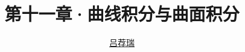 \documentclass[14pt,notheorems,leqno,xcolor={rgb}]{beamer} %
\begin{document}

\title{第十一章·曲线积分与曲面积分}
\author{\href{https://lvjr.bitbucket.io}{吕荐瑞}}

\begin{frame}[plain]
\titlepage
\end{frame}

\end{document}
